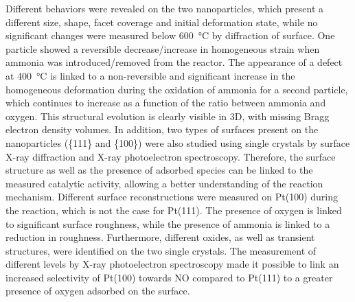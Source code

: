 \begin{mdframed}[linecolor=Prune,linewidth=1]
\begin{multicols}{2}
Different behaviors were revealed on the two nanoparticles, which present a different size, shape, facet coverage and initial deformation state, while no significant changes were measured below \qty{600}{\degreeCelsius} by diffraction of surface.
One particle showed a reversible decrease/increase in homogeneous strain when ammonia was introduced/removed from the reactor.
The appearance of a defect at \qty{400}{\degreeCelsius} is linked to a non-reversible and significant increase in the homogeneous deformation during the oxidation of ammonia for a second particle, which continues to increase as a function of the ratio between ammonia and oxygen.
This structural evolution is clearly visible in 3D, with missing Bragg electron density volumes.
In addition, two types of surfaces present on the nanoparticles (\{111\} and \{100\}) were also studied using single crystals by surface X-ray diffraction and X-ray photoelectron spectroscopy.
Therefore, the surface structure as well as the presence of adsorbed species can be linked to the measured catalytic activity, allowing a better understanding of the reaction mechanism.
Different surface reconstructions were measured on Pt(100) during the reaction, which is not the case for Pt(111).
The presence of oxygen is linked to significant surface roughness, while the presence of ammonia is linked to a reduction in roughness.
Furthermore, different oxides, as well as transient structures, were identified on the two single crystals.
The measurement of different levels by X-ray photoelectron spectroscopy made it possible to link an increased selectivity of Pt(100) towards NO compared to Pt(111) to a greater presence of oxygen adsorbed on the surface.
\end{multicols}

\end{mdframed}

\normalsize

\vspace{\fill}

\newpage\thispagestyle{empty}\null\newpage